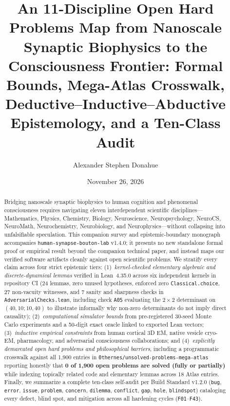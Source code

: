 \documentclass[11pt,letterpaper]{amsart}
\title[11-Discipline Open Problems, Mega-Atlas \& Consciousness Epistemology]{An 11-Discipline Open Hard Problems Map from Nanoscale Synaptic Biophysics to the Consciousness Frontier: Formal Bounds, Mega-Atlas Crosswalk, Deductive--Inductive--Abductive Epistemology, and a Ten-Class Audit}
\author{Alexander Stephen Donahue}
\date{November 26, 2026}
\begin{document}
\begin{abstract}
Bridging nanoscale synaptic biophysics to human cognition and phenomenal consciousness requires navigating eleven interdependent scientific disciplines---Mathematics, Physics, Chemistry, Biology, Neuroscience, Neuropsychology, NeuroCS, NeuroMath, Neurochemistry, Neurobiology, and Neurophysics---without collapsing into unfalsifiable speculation. This companion survey and epistemic-boundary monograph accompanies \texttt{human-synapse-bouton-lab} v1.4.0; it presents no new standalone formal proof or empirical result beyond the companion technical paper, and instead maps our verified software artifacts cleanly against open scientific problems. We stratify every claim across four strict epistemic tiers: (1)~\emph{kernel-checked elementary algebraic and discrete-dynamical lemmas} verified in Lean~4.35.0 across six independent kernels in repository CI (24 lemmas, zero unused hypotheses, enforced zero \texttt{Classical.choice}, 27 non-vacuity witnesses, and 7 sanity and sharpness checks in \texttt{AdversarialChecks.lean}, including check \texttt{A05} evaluating the $2\times 2$ determinant on $(40,10;10,40)$ to illustrate informally why non-zero determinants do not imply direct causality); (2)~\emph{computational simulator bounds} from pre-registered 30-seed Monte Carlo experiments and a 50-digit exact oracle linked to exported Lean vectors; (3)~\emph{inductive empirical constraints} from human cortical 3D EM, native vesicle cryo-EM, pharmacology, and adversarial consciousness collaborations; and (4)~\emph{explicitly demarcated open hard problems and philosophical barriers}, including a programmatic crosswalk against all 1,900 entries in \texttt{0thernes/unsolved-problems-mega-atlas} reporting honestly that \textbf{0 of 1,900 open problems are solved (fully or partially)} while indexing topically related code and elementary lemmas across 18 Atlas entries. Finally, we summarize a complete ten-class self-audit per Build Standard v1.2.0 (\texttt{bug}, \texttt{error}, \texttt{issue}, \texttt{problem}, \texttt{concern}, \texttt{dilemma}, \texttt{conflict}, \texttt{gap}, \texttt{hole}, \texttt{blindspot}) cataloging every defect, blind spot, and mitigation across all hardening cycles (\texttt{F01}--\texttt{F43}).
\end{abstract}

\maketitle
\end{document}
